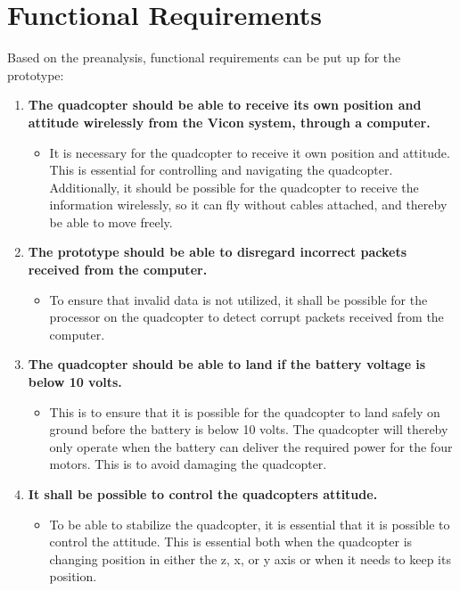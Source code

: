 \chapter{Functional Requirements}
\label{ch:functionalRequirements}
Based on the preanalysis, functional requirements can be put up for the prototype:

\begin{enumerate}[label=\textbf{\arabic*})]
\item \textbf{The quadcopter should be able to receive its own position and attitude wirelessly from the Vicon system, through a computer.}
\begin{itemize}
\item[] It is necessary for the quadcopter to receive it own position and attitude. This is essential for controlling and navigating the quadcopter. Additionally, it should be possible for the quadcopter to receive the information wirelessly, so it can fly without cables attached, and thereby be able to move freely.
\end{itemize}

\item \textbf{The prototype should be able to disregard incorrect packets received from the computer.}
\begin{itemize}
\item[] To ensure that invalid data is not utilized, it shall be possible for the processor on the quadcopter to detect corrupt packets received from the computer.
\end{itemize}

\item \textbf{The quadcopter should be able to land if the battery voltage is below 10 volts.}
\begin{itemize}
\item[] This is to ensure that it is possible for the quadcopter to land safely on ground before the battery is below 10 volts. The quadcopter will thereby only operate when the battery can deliver the required power for the four motors. This is to avoid damaging the quadcopter.
\end{itemize}

\item \textbf{It shall be possible to control the quadcopters attitude.}
\begin{itemize}
\item[] To be able to stabilize the quadcopter, it is essential that it is possible to control the attitude. This is essential both when the quadcopter is changing position in either the z, x, or y axis or when it needs to keep its position.
\end{itemize}


\end{enumerate}
